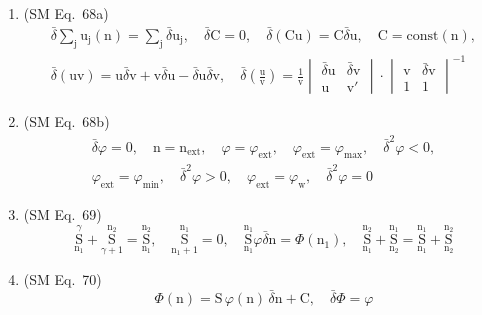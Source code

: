 \documentclass[12pt]{article}
\begin{document}
\begin{enumerate}[label=(\arabic*), series=formellist]
    \item (SM Eq.\ 68a) 
    \[
    \begin{gathered}
    \bar{\delta} \sum_\mathrm{j} \mathrm{u_j}(\mathrm{n}) = \sum_\mathrm{j} \bar{\delta} \mathrm{u_j}, \quad \bar{\delta}\mathrm{C} = 0, \quad \bar{\delta}(\mathrm{Cu}) = \mathrm{C}\bar{\delta}\mathrm{u}, \quad \mathrm{C} = \mathrm{const}(\mathrm{n}), \\
    \bar{\delta}(\mathrm{uv}) = \mathrm{u}\bar{\delta}\mathrm{v} + \mathrm{v}\bar{\delta}\mathrm{u} - \bar{\delta}\mathrm{u}\bar{\delta}\mathrm{v}, \quad \bar{\delta}\left( \frac{\mathrm{u}}{\mathrm{v}} \right) = \frac{1}{\mathrm{v}} \begin{vmatrix} \bar{\delta}\mathrm{u} & \bar{\delta}\mathrm{v} \\ \mathrm{u} & \mathrm{v}' \end{vmatrix} \cdot \begin{vmatrix} \mathrm{v} & \bar{\delta}\mathrm{v} \\ 1 & 1 \end{vmatrix}^{-1}
    \end{gathered}
    \]

    \item (SM Eq.\ 68b) 
    \[
    \begin{gathered}
    \bar{\delta}\varphi = 0, \quad \mathrm{n} = \mathrm{n}_{\mathrm{ext}}, \quad \varphi = \varphi_{\mathrm{ext}}, \quad \varphi_{\mathrm{ext}} = \varphi_{\max}, \quad \bar{\delta}^2\varphi < 0, \\
    \varphi_{\mathrm{ext}} = \varphi_{\min}, \quad \bar{\delta}^2\varphi > 0, \quad \varphi_{\mathrm{ext}} = \varphi_\mathrm{w}, \quad \bar{\delta}^2\varphi = 0
    \end{gathered}
    \]

    \item (SM Eq.\ 69) 
    \[
    \underset{\mathrm{n}_1}{\overset{\gamma}{\mathrm{S}}} + \underset{\gamma+1}{\overset{\mathrm{n}_2}{\mathrm{S}}} = \underset{\mathrm{n}_1}{\overset{\mathrm{n}_2}{\mathrm{S}}}, \quad \underset{\mathrm{n}_1+1}{\overset{\mathrm{n}_1}{\mathrm{S}}} = 0, \quad \underset{\mathrm{n}_1}{\overset{\mathrm{n}_1}{\mathrm{S}}} \varphi \bar{\delta}\mathrm{n} = \Phi(\mathrm{n}_1), \quad \underset{\mathrm{n}_1}{\overset{\mathrm{n}_2}{\mathrm{S}}} + \underset{\mathrm{n}_2}{\overset{\mathrm{n}_1}{\mathrm{S}}} = \underset{\mathrm{n}_1}{\overset{\mathrm{n}_1}{\mathrm{S}}} + \underset{\mathrm{n}_2}{\overset{\mathrm{n}_2}{\mathrm{S}}}
    \]

    \item (SM Eq.\ 70) 
    \[
    \Phi(\mathrm{n}) = \mathrm{S}\,\varphi(\mathrm{n})\,\bar{\delta}\mathrm{n} + \mathrm{C}, \quad \bar{\delta}\Phi = \varphi
    \]


\end{enumerate}
\end{document}
